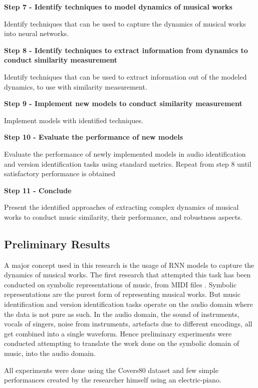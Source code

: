 \documentclass[../main.tex]{subfiles}
\begin{document}
\textbf{Step 7 - Identify techniques to model dynamics of musical works}
\par
Identify techniques that can be used to capture the dynamics of musical works into neural networks.

\textbf{Step 8 - Identify techniques to extract information from dynamics to conduct similarity measurement}
\par
Identify techniques that can be used to extract information out of the modeled dynamics, to use with similarity measurement.

\textbf{Step 9 - Implement new models to conduct similarity measurement}
\par
Implement models with identified techniques.


\textbf{Step 10 - Evaluate the performance of new models}
\par
Evaluate the performance of newly implemented models in audio identification and version identification tasks using standard metrics. Repeat from step 8 until satisfactory performance is obtained


\textbf{Step 11 - Conclude}
\par
Present the identified approaches of extracting complex dynamics of musical works to conduct music similarity, their performance, and robustness aspects.

\newpage
\subsection{Preliminary Results}

\par
A major concept used in this research is the usage of \gls{RNN} models to capture the dynamics of musical works. The first research that attempted this task has been conducted on symbolic representations of music, from \gls{MIDI} files \cite{tian_cheng_comparing_2018}. Symbolic representations are the purest form of representing musical works. But music identification and version identification tasks operate on the audio domain where the data is not pure as such. In the audio domain, the sound of instruments, vocals of singers, noise from instruments, artefacts due to different encodings, all get combined into a single waveform. Hence preliminary experiments were conducted attempting to translate the work done on the symbolic domain of music, into the audio domain.

\par
All experiments were done using the Covers80\cite{Covers80CoverSong} dataset and few simple performances created by the researcher himself using an electric-piano.
\end{document}
